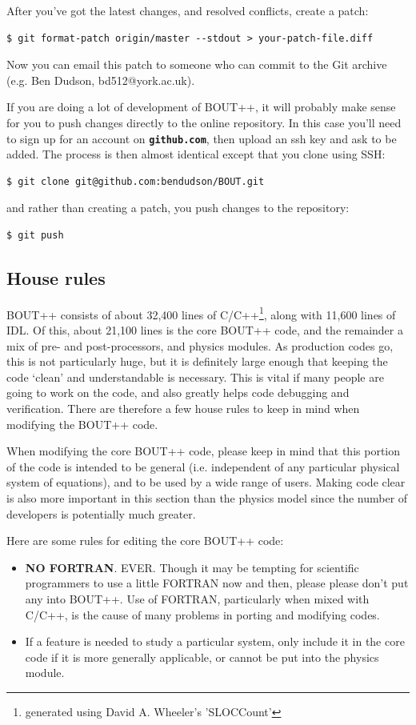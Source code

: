 \documentclass[12pt]{article}
\newcommand{\file}[1]{\texttt{\bf #1}}
\begin{document}
After you've got the latest changes, and resolved conflicts, create
a patch:
\begin{verbatim}
$ git format-patch origin/master --stdout > your-patch-file.diff
\end{verbatim}
Now you can email this patch to someone who can commit to the Git archive
(e.g. Ben Dudson, bd512@york.ac.uk).

If you are doing a lot of development of BOUT++, it will probably make sense
for you to push changes directly to the online repository. 
In this case you'll need to sign up for an account on \file{github.com},
then upload an ssh key and ask to be added. The process is
then almost identical except that you clone using SSH:
\begin{verbatim}
$ git clone git@github.com:bendudson/BOUT.git
\end{verbatim}
and rather than creating a patch, you push changes to the repository:
\begin{verbatim}
$ git push
\end{verbatim}

\subsection{House rules}

BOUT++ consists of about 32,400 lines of C/C++\footnote{generated using
David A. Wheeler's 'SLOCCount'},
along with 11,600 lines of IDL. Of this, about 21,100 lines is the core
BOUT++ code, and the remainder
a mix of pre- and post-processors, and physics modules. As production codes
go, this is not particularly huge, but it is definitely large enough that
keeping the code `clean' and understandable is necessary. This is vital
if many people are going to work on the code, and also greatly helps code
debugging and verification. There are therefore a few house rules to keep
in mind when modifying the BOUT++ code.

When modifying the core BOUT++ code, please keep in mind that this portion of the code
is intended to be general (i.e. independent of any particular physical system of equations),
and to be used by a wide range of users. Making code clear is also more important
in this section than the physics model since the number of developers is potentially
much greater. 

Here are some rules for editing the core BOUT++ code:
\begin{itemize}
\item {} {\bf NO FORTRAN}. EVER. Though it may be tempting for scientific programmers to use
a little FORTRAN now and then, please please don't put any into BOUT++. 
Use of FORTRAN, particularly when mixed with C/C++, is the cause of many problems in
porting and modifying codes. 
\item If a feature is needed to study a particular system, only include it in the
core code if it is more generally applicable, or cannot be put into the physics module.
\end{itemize}
\end{document}
